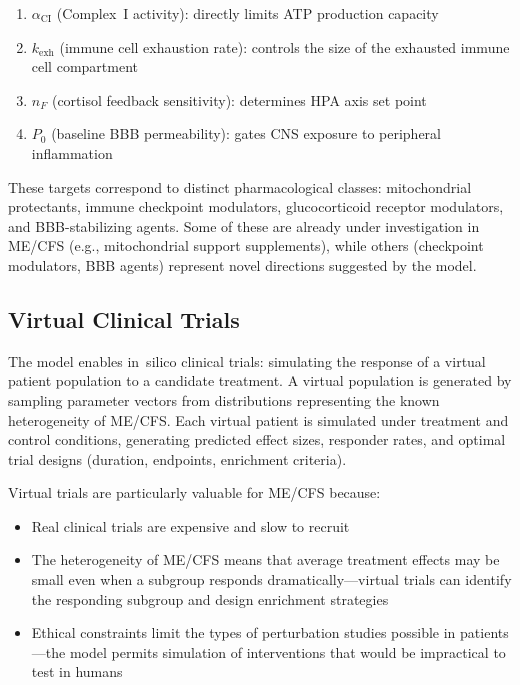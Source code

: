 \begin{enumerate}
    \item $\alpha_{\text{CI}}$ (Complex~I activity): directly limits ATP production capacity
    \item $k_{\text{exh}}$ (immune cell exhaustion rate): controls the size of the exhausted immune cell compartment
    \item $n_F$ (cortisol feedback sensitivity): determines HPA axis set point
    \item $P_0$ (baseline BBB permeability): gates CNS exposure to peripheral inflammation
\end{enumerate}

These targets correspond to distinct pharmacological classes: mitochondrial protectants, immune checkpoint modulators, glucocorticoid receptor modulators, and BBB-stabilizing agents. Some of these are already under investigation in ME/CFS (e.g., mitochondrial support supplements), while others (checkpoint modulators, BBB agents) represent novel directions suggested by the model.

\subsection{Virtual Clinical Trials}

The model enables in~silico clinical trials: simulating the response of a virtual patient population to a candidate treatment. A virtual population is generated by sampling parameter vectors from distributions representing the known heterogeneity of ME/CFS. Each virtual patient is simulated under treatment and control conditions, generating predicted effect sizes, responder rates, and optimal trial designs (duration, endpoints, enrichment criteria).

Virtual trials are particularly valuable for ME/CFS because:

\begin{itemize}
    \item Real clinical trials are expensive and slow to recruit
    \item The heterogeneity of ME/CFS means that average treatment effects may be small even when a subgroup responds dramatically---virtual trials can identify the responding subgroup and design enrichment strategies
    \item Ethical constraints limit the types of perturbation studies possible in patients---the model permits simulation of interventions that would be impractical to test in humans
\end{itemize}

